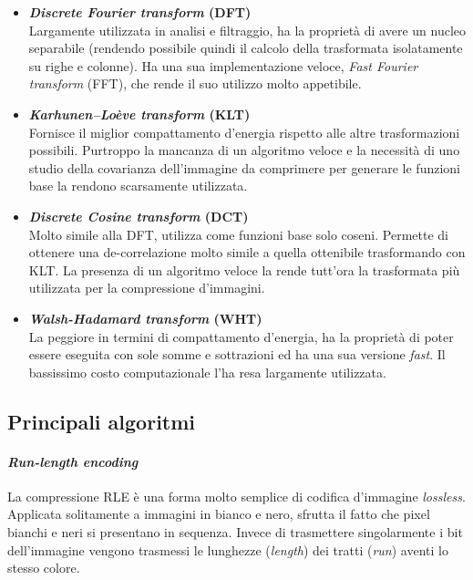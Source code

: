 \begin{itemize}
  
  \item \textbf{\emph{Discrete Fourier transform} (DFT)}\\
    Largamente utilizzata in analisi e filtraggio, ha la proprietà di avere un 
    nucleo separabile (rendendo possibile quindi il calcolo della trasformata 
    isolatamente su righe e colonne). Ha una sua implementazione veloce, 
    \emph{Fast Fourier transform} (FFT), che rende il suo utilizzo molto 
    appetibile.
    
  \item \textbf{\emph{Karhunen–Loève transform} (KLT)}\\
    Fornisce il miglior compattamento d'energia rispetto alle altre 
    trasformazioni possibili. Purtroppo la mancanza di un algoritmo veloce e la 
    necessità di uno studio della covarianza dell'immagine da comprimere per 
    generare le funzioni base la rendono scarsamente utilizzata.
    
  \item \textbf{\emph{Discrete Cosine transform} (DCT)}\\
    Molto simile alla DFT, utilizza come funzioni base solo coseni.
    Permette di ottenere una de-correlazione molto simile a quella ottenibile 
    trasformando con KLT. La presenza di un algoritmo veloce la rende tutt'ora 
    la trasformata più utilizzata per la compressione d'immagini.
   
  \item \textbf{\emph{Walsh-Hadamard transform} (WHT)}\\
    La peggiore in termini di compattamento d'energia, ha la proprietà di poter 
    essere eseguita con sole somme e sottrazioni ed ha una sua versione 
    \emph{fast}. Il bassissimo costo computazionale l'ha resa largamente 
    utilizzata.
    
\end{itemize}


\subsection{Principali algoritmi}

\paragraph{\textit{Run-length encoding} \\}
  La compressione RLE è una forma molto semplice di codifica d'immagine 
  \emph{lossless}. Applicata solitamente a immagini in bianco e nero, sfrutta 
  il fatto che pixel bianchi e neri si presentano in sequenza. Invece di 
  trasmettere singolarmente i bit dell'immagine vengono trasmessi le lunghezze 
  (\emph{length}) dei tratti (\emph{run}) aventi lo stesso colore.

